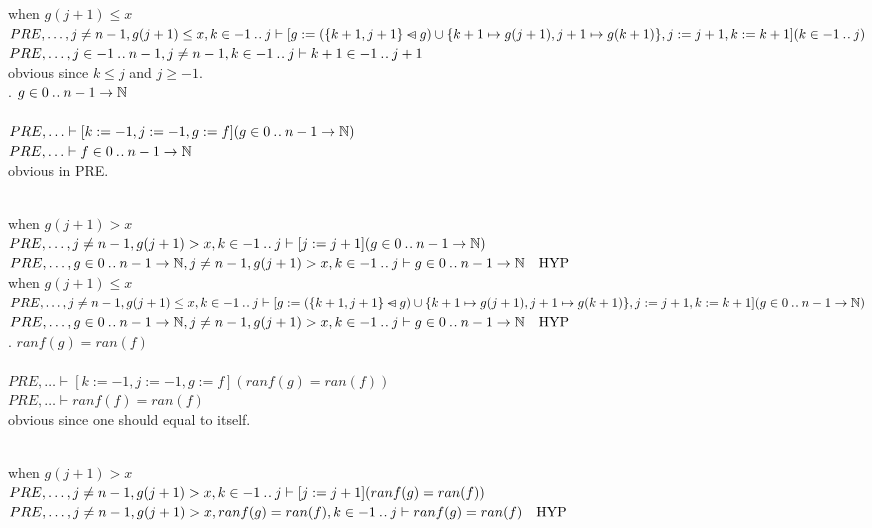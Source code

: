 \documentclass[11pt,a4paper,fleqn]{article}
\begin{document}
\noindent
when $g(j+1) \le x$\\
$PRE,\ldots,j \not= n-1,g(j+1) \le x,k \in -1 \mathbin{.\mkern1mu.} j \vdash [g :=(\{k+1, j+1\} \mathbin{\lhd\mkern-14mu-} g) \cup\{k+1 \mapsto g(j+1), j+1 \mapsto g(k+1)\},j:=j+1,k:=k+1](k \in -1 \mathbin{.\mkern1mu.} j) $\\
$PRE,\ldots,j \in -1 \mathbin{.\mkern1mu.} n-1 , j\not= n-1, k \in -1 \mathbin{.\mkern1mu.} j \vdash k+1 \in -1 \mathbin{.\mkern1mu.} j+1 $\\
obvious since $k \le j $ and $j \ge -1$.\\

. $g \in 0 \mathbin{.\mkern1mu.} n-1 \rightarrow \mathbb{N}$\\
\\
$PRE,\ldots \vdash [k:=-1,j:=-1,g:=f](g \in 0 \mathbin{.\mkern1mu.} n-1 \rightarrow \mathbb{N})$\\
$PRE,\ldots \vdash f \in 0 \mathbin{.\mkern1mu.} n-1 \rightarrow \mathbb{N}$ \quad {}\\
obvious in PRE.

\noindent
{}\\
when $g(j+1)>x$\\
$PRE,\ldots,j \not= n-1,g(j+1)>x,k \in -1 \mathbin{.\mkern1mu.} j  \vdash [j:=j+1](g \in 0 \mathbin{.\mkern1mu.} n-1 \rightarrow \mathbb{N}) $\\
$PRE,\ldots,g \in 0 \mathbin{.\mkern1mu.} n-1 \rightarrow \mathbb{N},j \not= n-1,g(j+1)>x,k \in -1 \mathbin{.\mkern1mu.} j  \vdash g \in 0 \mathbin{.\mkern1mu.} n-1 \rightarrow \mathbb{N} \quad \text{HYP}$\\

\noindent
when $g(j+1) \le x$\\
$PRE,\ldots,j \not= n-1,g(j+1) \le x,k \in -1 \mathbin{.\mkern1mu.} j  \vdash [g :=(\{k+1, j+1\} \mathbin{\lhd\mkern-14mu-} g) \cup\{k+1 \mapsto g(j+1), j+1 \mapsto g(k+1)\},j:=j+1,k:=k+1](g \in 0 \mathbin{.\mkern1mu.} n-1 \rightarrow \mathbb{N}) $\\
$PRE,\ldots,g \in 0 \mathbin{.\mkern1mu.} n-1 \rightarrow \mathbb{N},j \not= n-1,g(j+1)>x,k \in -1 \mathbin{.\mkern1mu.} j  \vdash g \in 0 \mathbin{.\mkern1mu.} n-1 \rightarrow \mathbb{N} \quad \text{HYP}$\\

. $ranf(g) = ran(f)$\\
\\
$PRE,\ldots \vdash [k:=-1,j:=-1,g:=f](ranf(g) = ran(f)) $\\
$PRE,\ldots \vdash ranf(f) = ran(f) $\\
obvious since one should equal to itself.

\noindent
{}\\
when $g(j+1)>x$\\
$PRE,\ldots,j \not= n-1,g(j+1)>x,k \in -1 \mathbin{.\mkern1mu.} j  \vdash [j:=j+1](ranf(g) = ran(f)) $\\
$PRE,\ldots,j \not= n-1,g(j+1)>x,ranf(g) = ran(f),k \in -1 \mathbin{.\mkern1mu.} j  \vdash ranf(g) = ran(f) \quad \text{HYP}$\\
\end{document}
